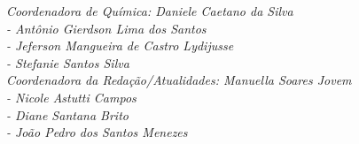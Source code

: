 \noindent
\textit{Coordenadora de Química: Daniele Caetano da Silva}\\
\textit{- Antônio Gierdson Lima dos Santos}\\
\textit{- Jeferson Mangueira de Castro Lydijusse}\\
\textit{- Stefanie Santos Silva}\\

\noindent
\textit{Coordenadora da Redação/Atualidades: Manuella Soares Jovem}\\
\textit{- Nicole Astutti Campos}\\
\textit{- Diane Santana Brito}\\
\textit{- João Pedro dos Santos Menezes}\\



\setlength{\parskip}{0mm}